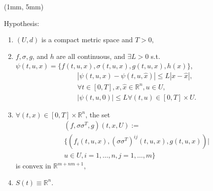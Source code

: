 \begin{frame}[plain]
    \begin{textblock*}{70mm}(1mm, 5mm)
        \begin{graybox}{Hypothesis:}
            \begin{enumerate}[(\textbf{{SE}}-1)]
                \item<1->
                    $(U,d)$ is a compact metric space and $T>0$,
                \item<2->
                    $f,\sigma,g$, and $h$ are all continuous, and 
                    $\exists L>0$ 
                    s.t.
                    $
                        \psi(t,u,x)=
                            \{f(t,u,x),
                                \sigma(t,u,x),
                                g(t,u,x),
                                h(x)
                            \}
                   $, 
                    \begin{align*}
                        & |\psi(t,u,x) - \psi(t, u, \hat{x})|
                                \leq L|x-\hat{x}|,
                        \\
                        &
                            \forall t
                            \in [0,T], x,
                            \hat{x}
                                \in \mathbb{R}^n,u \in U,
                        \\
                        & |\psi(t,u,0)|
                            \leq 
                                L \forall (t,u)
                                \in[0,T] \times U.
                    \end{align*}
                \item<3->
                    $
                        \forall (t,x) \in [0,T] \times \mathbb{R} ^ n
                    $, the set
                    \begin{align*}
                        & (f, \sigma \sigma ^ T, g) ( t, x, U):=
                        \\
                            &
                            \{(
                                f_i(t,u,x),
                                (\sigma\sigma^T)^{ij}(t,u,x),g(t,u,x))|
                        \\
                        &
                        u\in U,i=1,\ldots,n,j=1,\ldots,m\}
                    \end{align*}
                    is convex in $\mathbb{R}^{m+nm+1}$,
                \item<4->
                $S(t)\equiv\mathbb{R}^n$.
            \end{enumerate}
        \end{graybox}
    \end{textblock*}
\end{frame}
